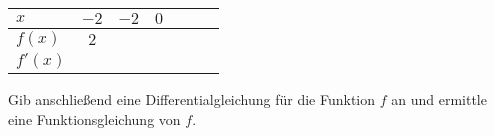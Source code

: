 \begin{beispiel}[K8 - DDG]{1}
\begin{center}
	\begin{tabular}{|l|c|c|c|c|c|c|}\hline
	\cellcolor[gray]{0.9}$x$&$-2$&$-2$&$0$&\antwort{$2$}&\antwort{$2$}&\antwort{$4$}\\ \hline
	\cellcolor[gray]{0.9}$f(x)$&$2$&\antwort{$1$}&\antwort{$0$}&\antwort{$0$}&\antwort{$1$}&\antwort{$4$}\\ \hline
	\cellcolor[gray]{0.9}$f'(x)$&\antwort{$-1$}&\antwort{$-1$}&\antwort{$0$}&\antwort{$1$}&\antwort{$1$}&\antwort{2}\\ \hline
	\end{tabular}
\end{center}

Gib anschließend eine Differentialgleichung für die Funktion $f$ an und ermittle eine Funktionsgleichung von $f$.

\end{beispiel}